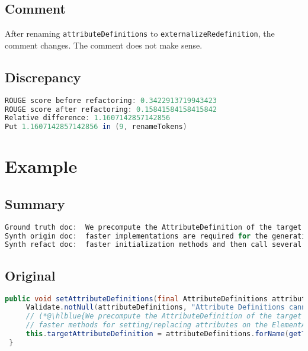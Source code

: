 \documentclass[11pt]{article}
\DeclareRobustCommand{\hlblue}[1]{{\sethlcolor{SeaGreen}\hl{#1}}}
\DeclareRobustCommand{\hlblue}[1]{{\sethlcolor{SkyBlue}\hl{#1}}}
\begin{document}
\subsection{Comment}

After renaming \texttt{attributeDefinitions} to \texttt{externalizeRedefinition}, the comment changes. The comment does not make sense.

\subsection{Discrepancy}

\begin{lstlisting}[language=java]
ROUGE score before refactoring: 0.3422913719943423
ROUGE score after refactoring: 0.15841584158415842
Relative difference: 1.1607142857142856
Put 1.1607142857142856 in (9, renameTokens)
\end{lstlisting}


\pagebreak
\section{Example}

\subsection{Summary}
\begin{lstlisting}[language=java]
Ground truth doc:  We precompute the AttributeDefinition of the target attribute in order to being able to use much
Synth origin doc:  faster implementations are required for the generation but cannot override or replace attributes instead of just
Synth refact doc:  faster initialization methods and then call several different and distinct values for this definition and the
\end{lstlisting}

\subsection{Original}
\begin{lstlisting}[language=java]
 public void setAttributeDefinitions(final AttributeDefinitions attributeDefinitions) {
     Validate.notNull(attributeDefinitions, "Attribute Definitions cannot be null");
     // (*@\hlblue{We precompute the AttributeDefinition of the target attribute in order to being able to use much}@*)
     // faster methods for setting/replacing attributes on the ElementAttributes implementation
     this.targetAttributeDefinition = attributeDefinitions.forName(getTemplateMode(), this.targetAttrCompleteName);
 }
\end{lstlisting}
\end{document}
